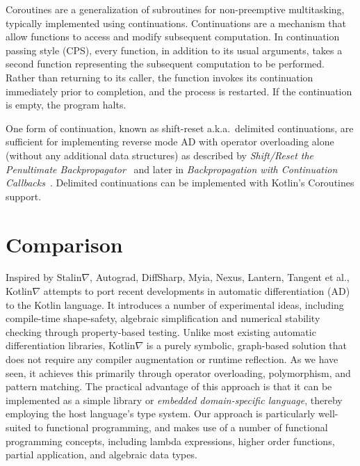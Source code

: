 \documentclass[12pt,initial,twoside,maitrise]{dms}
\numberwithin{equation}{section}
\numberwithin{table}{chapter}
\numberwithin{figure}{chapter}
\begin{document}
Coroutines are a generalization of subroutines for non-preemptive multitasking, typically implemented using continuations. Continuations are a mechanism that allow functions to access and modify subsequent computation. In continuation passing style (CPS), every function, in addition to its usual arguments, takes a second function representing the subsequent computation to be performed. Rather than returning to its caller, the function invokes its continuation immediately prior to completion, and the process is restarted. If the continuation is empty, the program halts.

One form of continuation, known as shift-reset a.k.a.\ delimited continuations, are sufficient for implementing reverse mode AD with operator overloading alone (without any additional data structures) as described by \textit{Shift/Reset the Penultimate Backpropagator}~\citep{wang2018demystifying} and later in \textit{Backpropagation with Continuation Callbacks}~\citep{wang2018backpropagation}. Delimited continuations can be implemented with Kotlin's Coroutines support.

\section{Comparison}\label{sec:comparison}

Inspired by Stalin$\nabla$, Autograd, DiffSharp, Myia, Nexus, Lantern, Tangent et al., Kotlin$\nabla$ attempts to port recent developments in automatic differentiation (AD) to the Kotlin language. It introduces a number of experimental ideas, including compile-time shape-safety, algebraic simplification and numerical stability checking through property-based testing. Unlike most existing automatic differentiation libraries, Kotlin$\nabla$ is a purely symbolic, graph-based solution that does not require any compiler augmentation or runtime reflection. As we have seen, it achieves this primarily through operator overloading, polymorphism, and pattern matching. The practical advantage of this approach is that it can be implemented as a simple library or \textit{embedded domain-specific language}, thereby employing the host language's type system. Our approach is particularly well-suited to functional programming, and makes use of a number of functional programming concepts, including lambda expressions, higher order functions, partial application, and algebraic data types. \\
\end{document}

